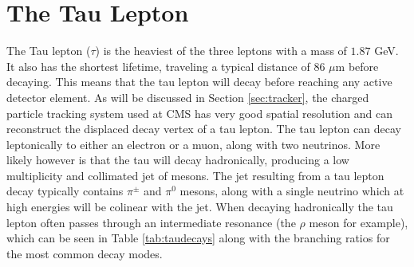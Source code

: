 \section{The Tau Lepton}
The Tau lepton ($\tau$) is the heaviest of the three leptons with a mass of $1.87$ GeV. 
It also has the shortest lifetime, traveling a typical distance of $86$ $\mu$m before decaying.
This means that the tau lepton will decay before reaching any active detector element. 
As will be discussed in Section \ref{sec:tracker}, the charged particle tracking system used at CMS has very good spatial resolution and can reconstruct the displaced decay vertex of a tau lepton.
The tau lepton can decay leptonically to either an electron or a muon, along with two neutrinos.
More likely  however is that the tau will decay hadronically, producing a low multiplicity and collimated jet of mesons. 
The jet resulting from a tau lepton decay typically contains $\pi^{\pm}$ and $\pi^{0}$ mesons, along with a single neutrino which at high energies will be colinear with the jet.
When decaying hadronically the tau lepton often passes through an intermediate resonance (the $\rho$ meson for example), which can be seen in Table \ref{tab:taudecays} along with the branching ratios for the most common decay modes.

